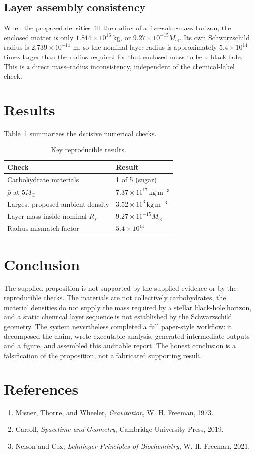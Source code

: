 \documentclass[11pt]{article}
\begin{document}
\subsection{Layer assembly consistency}
When the proposed densities fill the radius of a five-solar-mass horizon, the enclosed matter is only $1.844\times10^{16}$ kg, or $9.27\times10^{-15}M_\odot$. Its own Schwarzschild radius is $2.739\times10^{-11}$ m, so the nominal layer radius is approximately $5.4\times10^{14}$ times larger than the radius required for that enclosed mass to be a black hole. This is a direct mass--radius inconsistency, independent of the chemical-label check.

\section{Results}
Table~\ref{tab:results} summarizes the decisive numerical checks.
\begin{table}[h]
\centering
\caption{Key reproducible results.}
\label{tab:results}
\begin{tabular}{@{}ll@{}}
\toprule
Check & Result \\
\midrule
Carbohydrate materials & 1 of 5 (sugar) \\
$\bar\rho$ at $5M_\odot$ & $7.37\times10^{17}\,\mathrm{kg\,m^{-3}}$ \\
Largest proposed ambient density & $3.52\times10^3\,\mathrm{kg\,m^{-3}}$ \\
Layer mass inside nominal $R_s$ & $9.27\times10^{-15}M_\odot$ \\
Radius mismatch factor & $5.4\times10^{14}$ \\
\bottomrule
\end{tabular}
\end{table}

\section{Conclusion}
The supplied proposition is not supported by the supplied evidence or by the reproducible checks. The materials are not collectively carbohydrates, the material densities do not supply the mass required by a stellar black-hole horizon, and a static chemical layer sequence is not established by the Schwarzschild geometry. The system nevertheless completed a full paper-style workflow: it decomposed the claim, wrote executable analysis, generated intermediate outputs and a figure, and assembled this auditable report. The honest conclusion is a falsification of the proposition, not a fabricated supporting result.

\section*{References}
\begin{enumerate}
\item Misner, Thorne, and Wheeler, \emph{Gravitation}, W. H. Freeman, 1973.
\item Carroll, \emph{Spacetime and Geometry}, Cambridge University Press, 2019.
\item Nelson and Cox, \emph{Lehninger Principles of Biochemistry}, W. H. Freeman, 2021.
\end{enumerate}
\end{document}
